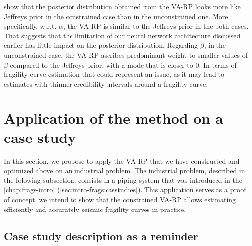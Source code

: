 show that the posterior distribution obtained from the VA-RP looks more like Jeffreys prior %
in the constrained case than in the unconstrained one. 
More specifically, w.r.t. $\alpha$, the VA-RP is similar to the Jeffreys prior in the both cases. That suggests that the limitation of our neural network architecture discussed earlier has little impact on the posterior distribution.
Regarding $\beta$,
in the unconstrained case, the VA-RP ascribes predominant weight to smaller values of $\beta$ compared to the Jeffreys prior, with a mode that is closer to $0$. In terms of fragility curve estimation that could represent an issue, as it may lead to estimates with thinner credibility intervals around a fragility curve. %









\section{Application of the method on a case study}\label{sec:constr-frags:appasg}


In this section, we propose to apply the VA-RP that we have constructed and optimized above
on an industrial problem.
The industrial problem, described in the folowing subsection, consists in a piping system that was introduced in the \cref{chap:frags-intro} (\cref{sec:intro-frags:casstudies}). 
This application serves as a proof of concept, we intend to show that the constrained VA-RP allows estimating efficiently and accurately seismic fragility curves in practice.








\subsection{Case study description as a reminder}\label{sec:constr-frags:subsec:asgdesc}


